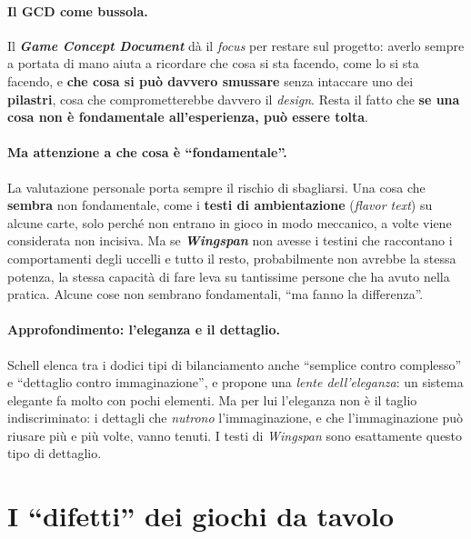 \paragraph{Il GCD come bussola.} Il \textbf{\emph{Game Concept Document}} dà il \emph{focus} per
restare sul progetto: averlo sempre a portata di mano aiuta a ricordare che cosa si sta
facendo, come lo si sta facendo, e \textbf{che cosa si può davvero smussare} senza intaccare
uno dei \textbf{pilastri}, cosa che comprometterebbe davvero il \emph{design}. Resta il fatto che
\textbf{se una cosa non è fondamentale all'esperienza, può essere tolta}.

\paragraph{Ma attenzione a che cosa è ``fondamentale''.} La valutazione personale porta sempre
il rischio di sbagliarsi. Una cosa che \textbf{sembra} non fondamentale, come i \textbf{testi di
ambientazione} (\emph{flavor text}) su alcune carte, solo perché non entrano in gioco in modo
meccanico, a volte viene considerata non incisiva. Ma se \textbf{\emph{Wingspan}} non avesse i
testini che raccontano i comportamenti degli uccelli e tutto il resto, probabilmente non avrebbe
la stessa potenza, la stessa capacità di fare leva su tantissime persone che ha avuto nella
pratica. Alcune cose non sembrano fondamentali, ``ma fanno la differenza''.

\paragraph{Approfondimento: l'eleganza e il dettaglio.} Schell elenca tra i dodici tipi di
bilanciamento anche ``semplice contro complesso'' e ``dettaglio contro immaginazione'', e
propone una \emph{lente dell'eleganza}: un sistema elegante fa molto con pochi elementi. Ma per
lui l'eleganza non è il taglio indiscriminato: i dettagli che \emph{nutrono} l'immaginazione,
e che l'immaginazione può riusare più e più volte, vanno tenuti. I testi di \emph{Wingspan} sono
esattamente questo tipo di dettaglio.

\section{I ``difetti'' dei giochi da tavolo}
\label{a14:sec:difetti}

